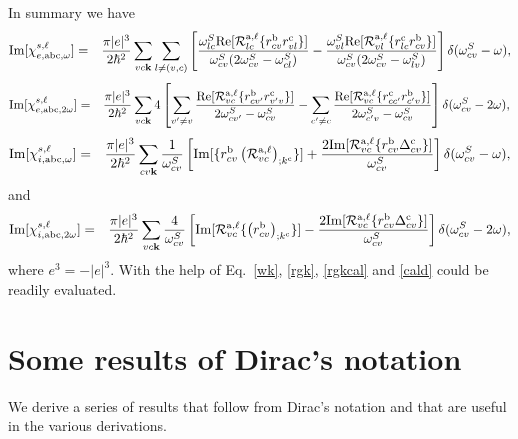 \documentclass[floatfix,prb,aps,superscriptaddress,11pt,preprint]{revtex4}
\begin{document}
In summary we have
\begin{eqnarray}\label{imchiew}
\mathrm{Im}[\chi_{e,\mathrm{a}\mathrm{b}\mathrm{c},\omega}^{s,\ell}]
&=&
\frac{\pi |e|^3}{2\hbar^2} 
\sum_{vc\mathbf{k}}
\sum_{l\neq(v,c)}
\left[
\frac{\omega^S_{lc}\mathrm{Re}[{\cal R}^{\mathrm{a},\ell}_{lc}\{r^{\mathrm{b}}_{cv}r^{\mathrm{c}}_{vl}\}]}
{\omega^S_{cv}(2\omega^S_{cv}-\omega^S_{cl})}
-
\frac{\omega^S_{vl}\mathrm{Re}[{\cal R}^{\mathrm{a},\ell}_{vl}\{r^{\mathrm{c}}_{lc}r^{\mathrm{b}}_{cv}\}]}
{\omega^S_{cv}(2\omega^S_{cv}-\omega^S_{lv})}
\right]
\delta(\omega^S_{cv}-\omega)
,
\end{eqnarray}  
\begin{eqnarray}\label{imchie2w}
\mathrm{Im}[\chi_{e,\mathrm{a}\mathrm{b}\mathrm{c},2\omega}^{s,\ell}]
&=&
\frac{\pi |e|^3}{2\hbar^2} 
\sum_{vc\mathbf{k}}
4
\left[
\sum_{v'\ne v}
\frac{\mathrm{Re}[{\cal
    R}^{\mathrm{a},\ell}_{vc}\{r^{\mathrm{b}}_{cv'}r^{\mathrm{c}}_{v'v}\}]}{2\omega^S_{cv'}-\omega^S_{cv}}
-
\sum_{c'\ne c}
\frac{\mathrm{Re}[{\cal R}^{\mathrm{a},\ell}_{vc}\{r^{\mathrm{c}}_{cc'}r^{\mathrm{b}}_{c'v}\}]}
{2\omega^S_{c'v}-\omega^S_{cv}}
\right]
\delta(\omega^S_{cv}-2\omega)
,
\end{eqnarray}  
\begin{eqnarray}\label{imchiwf}
\mathrm{Im}[\chi_{i,\mathrm{a}\mathrm{b}\mathrm{c},\omega}^{s,\ell}]
&=&
\frac{\pi|e|^3}{2\hbar^2}
\sum_{cv\mathbf{k}}
\frac{1}{\omega^S_{cv}}
\left[
\mathrm{Im}[\{r^{\mathrm{b}}_{cv}\left({\cal R}^{\mathrm{a},\ell}_{vc}\right)_{;k^{\mathrm{c}}}\}]
+
\frac{2\mathrm{Im}[{\cal R}^{\mathrm{a},\ell}_{vc}\{r^{\mathrm{b}}_{cv}\Delta^{\mathrm{c}}_{cv}\}]}{\omega^S_{cv}}
\right]
\delta(\omega^S_{cv}-\omega)
,
\end{eqnarray}
and
\begin{eqnarray}\label{imchi2wf}
\mathrm{Im}[\chi_{i,\mathrm{a}\mathrm{b}\mathrm{c},2\omega}^{s,\ell}]
&=&
\frac{\pi|e|^3}{2\hbar^2}\sum_{vc\mathbf{k}}
\frac{4}{\omega^S_{cv}}
\left[
\mathrm{Im}[{\cal R}^{\mathrm{a},\ell}_{vc}\{\left(r^{\mathrm{b}}_{cv}\right)_{;k^{\mathrm{c}}}\}]
-
\frac{2\mathrm{Im}[{\cal R}^{\mathrm{a},\ell}_{vc}\{r^{\mathrm{b}}_{cv}\Delta^{\mathrm{c}}_{cv}\}]}{\omega^S_{cv}}
\right]\delta(\omega^S_{cv}-2\omega)
,
\end{eqnarray}
where $e^3=-|e|^3$.
With the help of 
Eq.~\eqref{wk}, \eqref{rgk}, \eqref{rgkcal} and \eqref{cald} could be
readily evaluated.
\section{Some results of Dirac's notation}\label{ap_dirac}

We derive a series of results that follow from Dirac's notation and
that are  useful in the various derivations.
\end{document}
